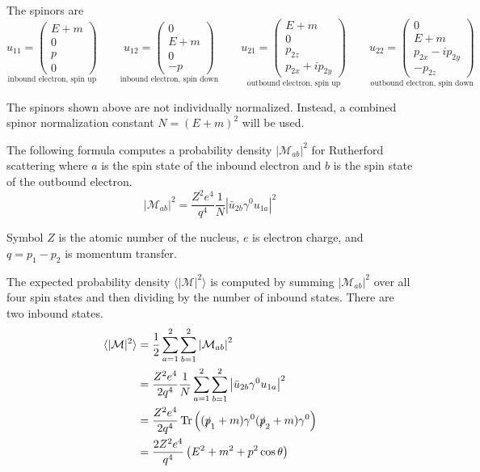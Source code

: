 \documentclass[12pt]{article}
\begin{document}
\bigskip
\noindent
The spinors are
\begin{equation*}
\underset{\text{inbound electron, spin up}}
{u_{11}=\begin{pmatrix}E+m\\0\\p\\0\end{pmatrix}}
\qquad
\underset{\text{inbound electron, spin down}}
{u_{12}=\begin{pmatrix}0\\E+m\\0\\-p\end{pmatrix}}
\qquad
\underset{\text{outbound electron, spin up}}
{u_{21}=\begin{pmatrix}E+m\\0\\p_{2z}\\p_{2x}+ip_{2y}\end{pmatrix}}
\qquad
\underset{\text{outbound electron, spin down}}
{u_{22}=\begin{pmatrix}0\\E+m\\p_{2x}-ip_{2y}\\-p_{2z}\end{pmatrix}}
\end{equation*}

\noindent
The spinors shown above are not individually normalized.
Instead, a combined spinor normalization constant $N=(E+m)^2$ will be used.

\bigskip
\noindent
The following formula computes a probability density $|\mathcal{M}_{ab}|^2$ for Rutherford scattering
where $a$ is the spin state of the inbound electron and $b$ is the spin state of the outbound electron.
\begin{equation*}
|\mathcal{M}_{ab}|^2=\frac{Z^2e^4}{q^4}\frac{1}{N}\left|\bar{u}_{2b}\gamma^0 u_{1a}\right|^2
\end{equation*}

\noindent
Symbol $Z$ is the atomic number of the nucleus,
$e$ is electron charge,
and $q=p_1-p_2$ is momentum transfer.

\bigskip
\noindent
The expected probability density
$\langle\vert\mathcal{M}\vert^2\rangle$
is computed by summing $|\mathcal{M}_{ab}|^2$
over all four spin states and then dividing by the number of inbound states.
There are two inbound states.
\begin{align*}
\langle\vert\mathcal{M}\vert^2\rangle
&=\frac{1}{2}\sum_{a=1}^2\sum_{b=1}^2\left|\mathcal{M}_{ab}\right|^2
\\
&=\frac{Z^2e^4}{2q^4}\frac{1}{N}\sum_{a=1}^2\sum_{b=1}^2\left|\bar{u}_{2b}\gamma^0 u_{1a}\right|^2
\\
&=\frac{Z^2e^4}{2q^4}\mathop{\rm Tr}\left((\slashed{p}_1+m)\gamma^0(\slashed{p}_2+m)\gamma^0\right)
\\
&=\frac{2Z^2e^4}{q^4}\left(E^2+m^2+p^2\cos\theta\right)
\end{align*}
\end{document}
